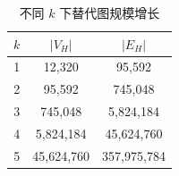 \begin{table}[H]
    \centering
    \caption{不同 $k$ 下替代图规模增长}
    \label{tab:exp_kadditive_scale}
    \setlength{\tabcolsep}{8pt}
    \renewcommand{\arraystretch}{1.1}
    \begin{tabular}{ccc}
        \toprule
        $k$ & $|V_H|$ & $|E_H|$\\
        \midrule
        1 & 12,320 & 95,592\\
        2 & 95,592 & 745,048\\
        3 & 745,048 & 5,824,184\\
        4 & 5,824,184 & 45,624,760\\
        5 & 45,624,760 & 357,975,784\\
        \bottomrule
    \end{tabular}
\end{table}